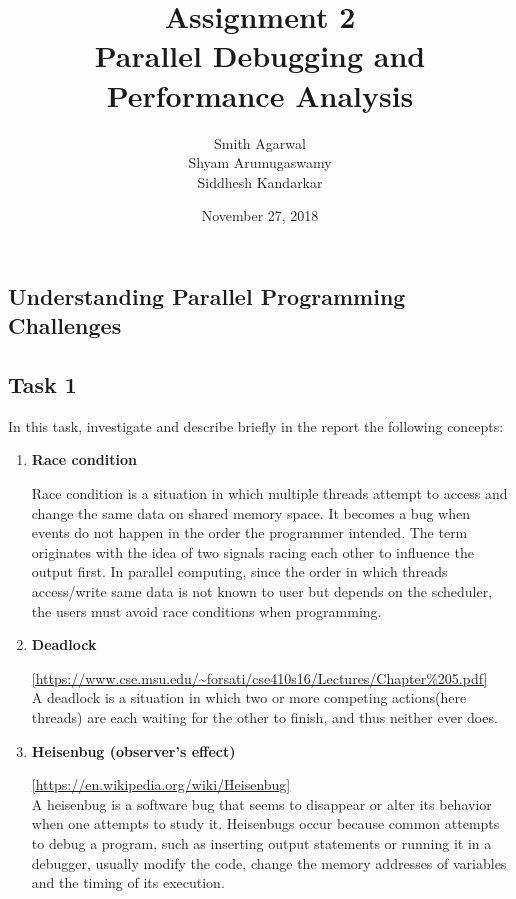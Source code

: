 \documentclass[10pt, letterpaper, twoside]{article}
\title{Assignment 2 \\ Parallel Debugging and Performance Analysis}
\author{Smith Agarwal \\ Shyam Arumugaswamy \\ Siddhesh Kandarkar}
\date{November 27, 2018}
\begin{document}
 
\begin{titlepage}
\maketitle


\section{Understanding Parallel Programming Challenges}

\subsection{Task 1}

In this task, investigate and describe briefly in the report the following concepts:

\begin{enumerate}
\item \textbf{Race condition} 

Race condition is a situation in which multiple threads attempt to access and change the same data on shared memory space. It becomes a bug when events do not happen in the order the programmer intended. The term originates with the idea of two signals racing each other to influence the output first. In parallel computing, since the order in which threads access/write same data is not known to user but depends on the scheduler, the users must avoid race conditions when programming.  \\

\item \textbf{Deadlock} 

\url{[https://www.cse.msu.edu/~forsati/cse410s16/Lectures/Chapter%205.pdf]} \\
A deadlock is a situation in which two or more competing actions(here threads) are each waiting for the other to finish, and thus neither ever does.\\

\item \textbf{Heisenbug (observer’s effect) } 

\url{[https://en.wikipedia.org/wiki/Heisenbug]} \\
A heisenbug is a software bug that seems to disappear or alter its behavior when one attempts to study it. Heisenbugs occur because common attempts to debug a program, such as inserting output statements or running it in a debugger, usually modify the code, change the memory addresses of variables and the timing of its execution. \\


\end{enumerate}
\end{titlepage}
\end{document}
